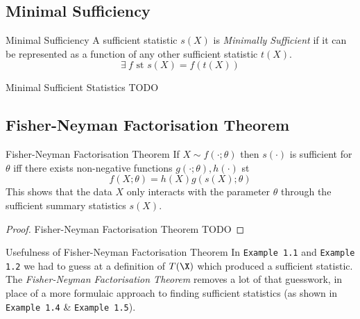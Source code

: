 \documentclass[11pt,a4paper]{article}
\begin{document}
\subsection{Minimal Sufficiency}

  \begin{definition}{Minimal Sufficiency}
    A sufficient statistic $s(X)$ is \textit{Minimally Sufficient} if it can be represented as a function of any other sufficient statistic $t(X)$.
    \[ \exists\ f\text{ st }s(X)=f(t(X)) \]
  \end{definition}

  \begin{example}{Minimal Sufficient Statistics}
    TODO
  \end{example}

\subsection{Fisher-Neyman Factorisation Theorem}

  \begin{theorem}{Fisher-Neyman Factorisation Theorem}
    If $X\sim f(\cdot;\theta)$ then $s(\cdot)$ is sufficient for $\theta$ iff there exists non-negative functions $g(\cdot;\theta),h(\cdot)$ st
    \[ f(X;\theta)=h(X)g(s(X);\theta) \]
    This shows that the data $X$ only interacts with the parameter $\theta$ through the sufficient summary statistics $s(X)$.
  \end{theorem}

  \begin{proof}{Fisher-Neyman Factorisation Theorem}
    TODO
  \end{proof}

  \begin{remark}{Usefulness of Fisher-Neyman Factorisation Theorem}
    In \texttt{Example 1.1}  and \texttt{Example 1.2} we had to guess at a definition of $T(\X)$ which produced a sufficient statistic. The \textit{Fisher-Neyman Factorisation Theorem} removes a lot of that guesswork, in place of a more formulaic approach to finding sufficient statistics (as shown in \texttt{Example 1.4} \& \texttt{Example 1.5}).
  \end{remark}
\end{document}
